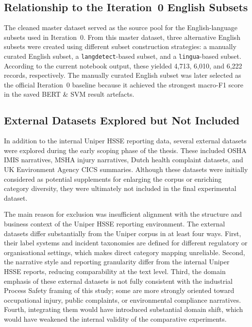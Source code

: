 \documentclass[11pt, titlepage, bibliography=totoc]{scrreprt}
\begin{document}
\subsection{Relationship to the Iteration~0 English Subsets}

The cleaned master dataset served as the source pool for the English-language subsets used in Iteration~0. From this master dataset, three alternative English subsets were created using different subset construction strategies: a manually curated English subset, a \texttt{langdetect}-based subset, and a \texttt{lingua}-based subset. According to the current notebook output, these yielded 4,713, 6,010, and 6,222 records, respectively. The manually curated English subset was later selected as the official Iteration~0 baseline because it achieved the strongest macro-F1 score in the saved BERT \& SVM result artefacts.

\subsection{External Datasets Explored but Not Included}

In addition to the internal Uniper HSSE reporting data, several external datasets were explored during the early scoping phase of the thesis. These included OSHA IMIS narratives, MSHA injury narratives, Dutch health complaint datasets, and UK Environment Agency CICS summaries. Although these datasets were initially considered as potential supplements for enlarging the corpus or enriching category diversity, they were ultimately not included in the final experimental dataset.

The main reason for exclusion was insufficient alignment with the structure and business context of the Uniper HSSE reporting environment. The external datasets differ substantially from the Uniper corpus in at least four ways. First, their label systems and incident taxonomies are defined for different regulatory or organisational settings, which makes direct category mapping unreliable. Second, the narrative style and reporting granularity differ from the internal Uniper HSSE reports, reducing comparability at the text level. Third, the domain emphasis of these external datasets is not fully consistent with the industrial Process Safety framing of this study; some are more strongly oriented toward occupational injury, public complaints, or environmental compliance narratives. Fourth, integrating them would have introduced substantial domain shift, which would have weakened the internal validity of the comparative experiments.
\end{document}
